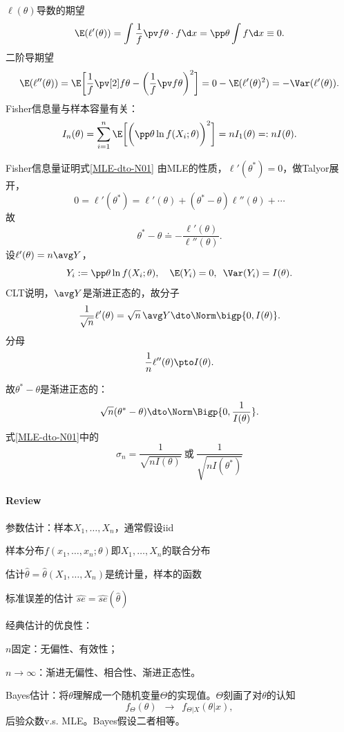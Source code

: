 $\ell(\theta)$导数的期望
\[
	\E(\ell'(\theta))=\int\frac1f\pv f\theta\cdot f\d x=\pp\theta\int f\d x\equiv 0.
\]
二阶导期望
\[
	\E(\ell''(\theta))=\E\biggl[\frac1f\pv[2]f\theta-\biggl(\frac1f\pv f\theta\biggr)^2\biggr]=0-\E(\ell'(\theta)^2)=-\Var(\ell'(\theta)).
\]
Fisher信息量与样本容量有关：
\[
	I_n(\theta)=\sum_{i=1}^n\E\biggl[\biggl(\pp\theta\ln f(X_i;\theta)\biggr)^2\biggr]=nI_1(\theta)=:nI(\theta).
\]
\begin{example}{Fisher信息量证明式\eqref{MLE-dto-N01}}{}
	由MLE的性质，$\ell'(\theta^\ast)=0$，做Talyor展开，
	\[
		0=\ell'(\theta^\ast)=\ell'(\theta)+(\theta^\ast-\theta)\ell''(\theta)+\cdots
	\]
	故
	\[
		\theta^\ast-\theta\doteq-\frac{\ell'(\theta)}{\ell''(\theta)}.
	\]
	设$\ell'(\theta)=n\avg Y$，
	\[
		Y_i:=\pp\theta\ln f(X_i;\theta),\quad\E(Y_i)=0,\enspace\Var(Y_i)=I(\theta).
	\]
	CLT说明，$\avg Y$是渐进正态的，故分子
	\[
		\frac1{\sqrt n}\ell'(\theta)=\sqrt n\,\avg Y\dto\Norm\bigp{0,I(\theta)}.
	\]
	分母
	\[
		\frac1n\ell''(\theta)\pto I(\theta).
	\]

	故$\theta^\ast-\theta$是渐进正态的：
	\[
		\sqrt n(\theta^\ast-\theta)\dto\Norm\Bigp{0,\frac1{I(\theta)}}.
	\]
	式\eqref{MLE-dto-N01}中的 
	\[
		\sigma_n=\frac1{\sqrt{nI(\theta)}}~\text{或}~\frac1{\sqrt{nI(\theta^\ast)}}
	\]
\end{example}
\paragraph{Review}
\begin{compactenum}
	\item 参数估计：样本$X_1,\ldots,X_n$，通常假设iid
	
	样本分布$f(x_1,\ldots,x_n;\theta)$即$X_1,\ldots,X_n$的联合分布

	估计$\hat\theta=\hat\theta(X_1,\ldots,X_n)$是统计量，样本的函数

	标准误差的估计
	$\hat{se}=\hat{se}(\hat\theta)$
	\item 经典估计的优良性：
	
	$n$固定：无偏性、有效性；

	$n\to\infty$：渐进无偏性、相合性、渐进正态性。

	\item Bayes估计：将$\theta$理解成一个随机变量$\varTheta$的实现值。$\varTheta$刻画了对$\theta$的认知
	\[
		f_\varTheta(\theta)\enspace\to\enspace f_{\varTheta|X}(\theta|x),
	\]
	后验众数v.s. MLE。Bayes假设二者相等。
\end{compactenum}
